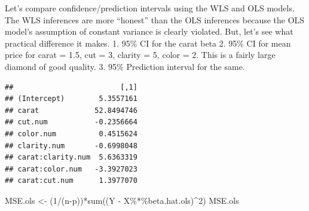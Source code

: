 \documentclass[
]{book}
\newenvironment{Shaded}{\begin{snugshade}}{\end{snugshade}}
\newcommand{\AttributeTok}[1]{\textcolor[rgb]{0.77,0.63,0.00}{#1}}
\newcommand{\DecValTok}[1]{\textcolor[rgb]{0.00,0.00,0.81}{#1}}
\newcommand{\DocumentationTok}[1]{\textcolor[rgb]{0.56,0.35,0.01}{\textbf{\textit{#1}}}}
\newcommand{\FunctionTok}[1]{\textcolor[rgb]{0.00,0.00,0.00}{#1}}
\newcommand{\NormalTok}[1]{#1}
\newcommand{\OtherTok}[1]{\textcolor[rgb]{0.56,0.35,0.01}{#1}}
\newcommand{\SpecialCharTok}[1]{\textcolor[rgb]{0.00,0.00,0.00}{#1}}
\begin{document}
Let's compare confidence/prediction intervals using the WLS and OLS models. The WLS inferences are more ``honest'' than the OLS inferences because the OLS model's assumption of constant variance is clearly violated. But, let's see what practical difference it makes.
1. 95\% CI for the carat beta
2. 95\% CI for mean price for carat = 1.5, cut = 3, clarity = 5, color = 2. This is a fairly large diamond of good quality.
3. 95\% Prediction interval for the same.

\begin{Shaded}
\end{Shaded}

\begin{verbatim}
##                         [,1]
## (Intercept)        5.3557161
## carat             52.8494746
## cut.num           -0.2356664
## color.num          0.4515624
## clarity.num       -0.6998048
## carat:clarity.num  5.6363319
## carat:color.num   -3.3927023
## carat:cut.num      1.3977070
\end{verbatim}

\begin{Shaded}
\begin{Highlighting}[]
\NormalTok{MSE.ols }\OtherTok{\textless{}{-}}\NormalTok{ (}\DecValTok{1}\SpecialCharTok{/}\NormalTok{(n}\SpecialCharTok{{-}}\NormalTok{p))}\SpecialCharTok{*}\FunctionTok{sum}\NormalTok{((Y }\SpecialCharTok{{-}}\NormalTok{ X}\SpecialCharTok{\%*\%}\NormalTok{beta.hat.ols)}\SpecialCharTok{\^{}}\DecValTok{2}\NormalTok{)}
\NormalTok{MSE.ols}
\end{Highlighting}
\end{Shaded}
\end{document}
